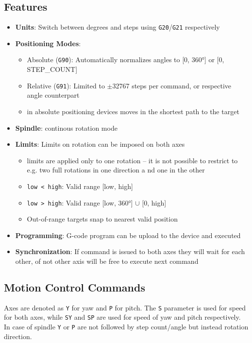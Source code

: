 \subsection{Features}
\begin{itemize}
  \item \textbf{Units}: Switch between degrees and steps using \texttt{G20}/\texttt{G21} respectively
  \item \textbf{Positioning Modes}:
    \begin{itemize}
      \item Absolute (\texttt{G90}): Automatically normalizes angles to [0, 360°] or [0, STEP\_COUNT]
      \item Relative (\texttt{G91}): Limited to $\pm$32767 steps per command, or respective angle counterpart
      \item in absolute positioning devices moves in the shortest path to the target
    \end{itemize}
  \item \textbf{Spindle}: continous rotation mode
  \item \textbf{Limits}: Limits on rotation can be imposed on both axes
    \begin{itemize}
      \item limits are applied only to one rotation -- it is not possible to restrict to e.g. two full rotations in one direction a nd one in the other
      \item \texttt{low < high}: Valid range [low, high]
      \item \texttt{low > high}: Valid range [low, 360°] $\cup$ [0, high]
      \item Out-of-range targets snap to nearest valid position
    \end{itemize}
  \item \textbf{Programming}: G-code program can be upload to the device and executed
  \item \textbf{Synchronization}: If command is issued to both axes they will wait for each other, of not other axis will be free to execute next command
\end{itemize}
\newpage

\subsection*{Motion Control Commands}

Axes are denoted as \texttt{Y} for yaw and \texttt{P} for pitch. The \texttt{S} parameter is used for speed for both axes, while \texttt{SY} and \texttt{SP} are used for speed of yaw and pitch respectively. In case of spindle \texttt{Y} or \texttt{P} are not followed by step count/angle but instead rotation direction.

